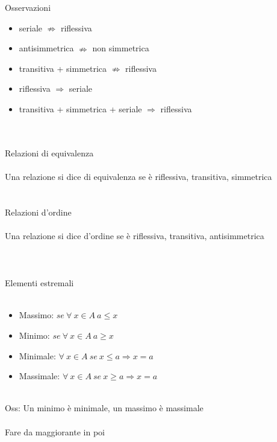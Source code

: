 \documentclass{article}
\begin{document}
		{\large Osservazioni}
		\begin{itemize}
			\item seriale \(\nRightarrow\) riflessiva
			\item antisimmetrica \(\nRightarrow\) non simmetrica
			\item transitiva + simmetrica \(\nRightarrow\) riflessiva
			\item riflessiva \(\Rightarrow\) seriale
			\item transitiva + simmetrica + seriale \(\Rightarrow\) riflessiva
		\end{itemize}
		\ \\\\
		
		{\Large Relazioni di equivalenza}\\\\
		{\large Una relazione si dice di equivalenza se è riflessiva, transitiva, simmetrica}\\\\\\
	
		{\Large Relazioni d'ordine}\\\\
		{\large Una relazione si dice d'ordine se è riflessiva, transitiva, antisimmetrica}\\\\\\\\
		
		{\Large Elementi estremali}\\\\
		\begin{itemize}
			\item Massimo: \(se \ \forall \ x \in A \ a\leq x\)
			\item Minimo: \(se \ \forall \ x \in A \ a\geq x\)
			\item Minimale: \(\forall \ x \in A \ se\ x \leq a \Rightarrow x=a\)
			\item Massimale: \(\forall \ x \in A \ se\ x \geq a \Rightarrow x=a\)
		\end{itemize}
	 	\ \\
	 	{\large Oss: Un minimo è minimale, un massimo è massimale}\\\\
	 	
	 	Fare da maggiorante in poi
		
		
		
		
		
		
\end{document}
